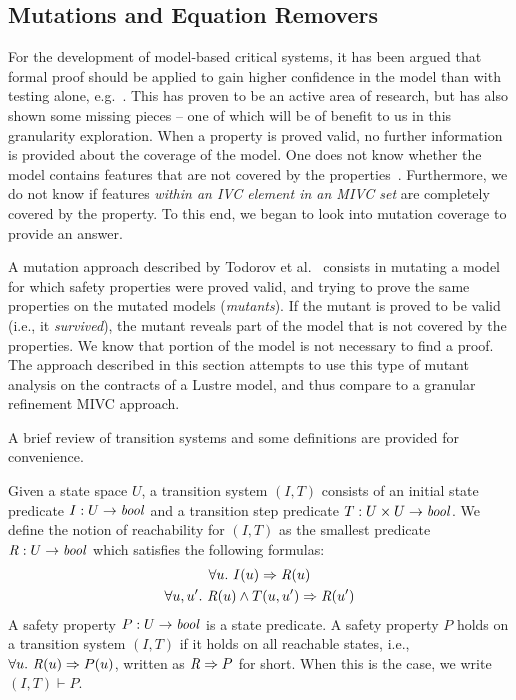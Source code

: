 \subsection{Mutations and Equation Removers}
\label{sec:granularityMutationEq}
For the development of model-based critical systems, it has been argued that formal proof should be applied to gain higher confidence in the model than with testing alone, e.g.~\cite{hardin2009development,miller2010software,rushby2009software,bozzano2003improving}. This has proven to be an active area of research, but has also shown some missing pieces -- one of which will be of benefit to us in this granularity exploration. When a property is proved valid, no further information is provided about the coverage of the model. One does not know whether the model contains features that are not covered by the properties~\cite{NFM2020Todorov}. Furthermore, we do not know if features \emph{within an IVC element in an MIVC set} are completely covered by the property. To this end, we began to look into mutation coverage to provide an answer. 

A mutation approach described by Todorov et al.~\cite{NFM2020Todorov} consists in mutating a model for which safety properties were proved valid, and trying to prove the same properties on the mutated models (\emph{mutants}). If the mutant is proved to be valid (i.e., it \emph{survived}), the mutant reveals part of the model that is not covered by the properties. We know that portion of the model is not necessary to find a proof. The approach described in this section attempts to use this type of mutant analysis on the contracts of a Lustre model, and thus compare to a granular refinement MIVC approach. 

A brief review of transition systems and some definitions are provided for convenience. 

Given a state space $U$, a transition system $(I,T)$ consists of an
initial state predicate $I : U \to \mathit{bool}$ and a transition step
predicate $T : U \times U \to \mathit{bool}$.
We define the notion of
reachability for $(I, T)$ as the smallest predicate $\mathit{R} : U \to
\mathit{bool}$ which satisfies the following formulas:
\begin{gather*}
  \forall u.~ I(u) \Rightarrow \mathit{R}(u) \\
  \forall u, u'.~ \mathit{R}(u) \land T(u, u') \Rightarrow \mathit{R}(u')
\end{gather*}
A safety property $P : U \to \mathit{bool}$ is a state predicate. A safety
property $P$ holds on a transition system $(I, T)$ if it holds on all
reachable states, i.e., $\forall u.~ \mathit{R}(u) \Rightarrow P(u)$,
written as $\mathit{R} \Rightarrow P$ for short. When this is the case, we
write $(I, T)\vdash P$.

